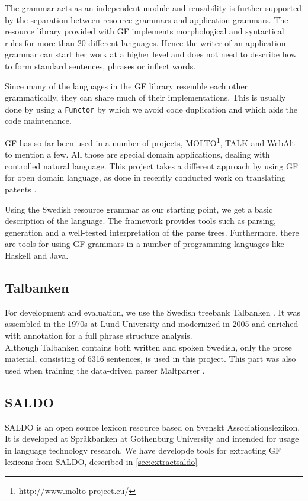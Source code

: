 \documentclass[10pt, a4paper]{article}
\begin{document}
The grammar acts as an independent module and reusability is further supported
by the separation between resource grammars and application grammars. The
resource library provided with GF implements morphological and syntactical
rules for more than 20 different languages.  Hence the writer of an application
grammar can start her work at a higher level and does not need to describe how
to form standard sentences, phrases or inflect words.

Since many of the languages in the GF library resemble each other grammatically,
they can share much of their implementations. This is usually done by using a
\verb|Functor| by which we avoid code duplication and which aids the code maintenance.

GF has so far been used in a number of projects,
MOLTO\footnote{http://www.molto-project.eu/}, TALK \cite{talk}
and WebAlt \cite{webalt} to mention a few. 
All those are special domain applications, dealing with controlled natural
language.
This project takes a different approach by using GF for open domain language,
as done in recently conducted work on translating patents \cite{patent}.

Using the Swedish resource grammar as our starting
point, we get a basic description of the language. The framework provides
tools such as parsing, generation and
a well-tested interpretation of the parse trees. Furthermore, there are tools
for using GF grammars in a number of programming languages like Haskell
and Java. 



\subsection{Talbanken}
For development and evaluation, we use the Swedish treebank
Talbanken \cite{talbanken}.
It was assembled in the 1970s at Lund University and modernized
in 2005 \cite{talbanken05} and
enriched with annotation for a full phrase structure analysis.  \\
Although Talbanken contains both written and spoken Swedish,
only the prose material, consisting of 6316 sentences, is used in this
project.
This part was also used when training the data-driven parser Maltparser \cite{malt}. \\

\subsection{SALDO}
SALDO \cite{saldo} is an open source lexicon resource
based on Svenskt Associationslexikon. It is
developed at Spr{\aa}kbanken at Gothenburg University
and intended for usage in language technology
research. 
We have developde tools for extracting GF lexicons
from SALDO, described in \ref{sec:extractsaldo}
\end{document}
